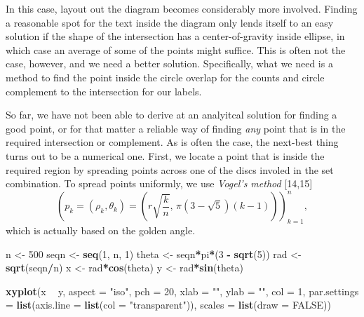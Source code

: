 \documentclass[
  headsepline=true,headings=standardclasses%
]{scrartcl}
\newenvironment{Shaded}{\begin{snugshade}}{\end{snugshade}}
\newcommand{\KeywordTok}[1]{\textcolor[rgb]{0.13,0.29,0.53}{\textbf{#1}}}
\newcommand{\DataTypeTok}[1]{\textcolor[rgb]{0.13,0.29,0.53}{#1}}
\newcommand{\DecValTok}[1]{\textcolor[rgb]{0.00,0.00,0.81}{#1}}
\newcommand{\StringTok}[1]{\textcolor[rgb]{0.31,0.60,0.02}{#1}}
\newcommand{\OtherTok}[1]{\textcolor[rgb]{0.56,0.35,0.01}{#1}}
\newcommand{\OperatorTok}[1]{\textcolor[rgb]{0.81,0.36,0.00}{\textbf{#1}}}
\newcommand{\NormalTok}[1]{#1}
\theoremstyle{definition}
\theoremstyle{definition}
\theoremstyle{remark}
\begin{document}
In this case, layout out the diagram becomes considerably more involved.
Finding a reasonable spot for the text inside the diagram only lends
itself to an easy solution if the shape of the intersection has a
center-of-gravity inside ellipse, in which case an average of some of
the points might suffice. This is often not the case, however, and we
need a better solution. Specifically, what we need is a method to find
the point inside the circle overlap for the counts and circle complement
to the intersection for our labels.

So far, we have not been able to derive at an analyitcal solution for
finding a good point, or for that matter a reliable way of finding
\emph{any} point that is in the required intersection or complement. As
is often the case, the next-best thing turns out to be a numerical one.
First, we locate a point that is inside the required region by spreading
points across one of the discs involed in the set combination. To spread
points uniformly, we use \emph{Vogel's method} {[}14,15{]} \[
\left( p_k = (\rho_k, \theta_k) = \left( r \sqrt{\frac{k}{n}},\, \pi (3 - \sqrt{5})(k - 1) \right) \right)_{k=1}^n,
\] which is actually based on the golden angle.

\begin{Shaded}
\begin{Highlighting}[]
\NormalTok{n <-}\StringTok{ }\DecValTok{500}
\NormalTok{seqn <-}\StringTok{ }\KeywordTok{seq}\NormalTok{(}\DecValTok{1}\NormalTok{, n, }\DecValTok{1}\NormalTok{)}
\NormalTok{theta <-}\StringTok{ }\NormalTok{seqn}\OperatorTok{*}\NormalTok{pi}\OperatorTok{*}\NormalTok{(}\DecValTok{3} \OperatorTok{-}\StringTok{ }\KeywordTok{sqrt}\NormalTok{(}\DecValTok{5}\NormalTok{))}
\NormalTok{rad <-}\StringTok{ }\KeywordTok{sqrt}\NormalTok{(seqn}\OperatorTok{/}\NormalTok{n)}
\NormalTok{x <-}\StringTok{ }\NormalTok{rad}\OperatorTok{*}\KeywordTok{cos}\NormalTok{(theta)}
\NormalTok{y <-}\StringTok{ }\NormalTok{rad}\OperatorTok{*}\KeywordTok{sin}\NormalTok{(theta)}

\KeywordTok{xyplot}\NormalTok{(x }\OperatorTok{~}\StringTok{ }\NormalTok{y, }\DataTypeTok{aspect =} \StringTok{"iso"}\NormalTok{, }\DataTypeTok{pch =} \DecValTok{20}\NormalTok{, }\DataTypeTok{xlab =} \StringTok{""}\NormalTok{, }\DataTypeTok{ylab =} \StringTok{""}\NormalTok{,}
       \DataTypeTok{col =} \DecValTok{1}\NormalTok{,}
       \DataTypeTok{par.settings =} \KeywordTok{list}\NormalTok{(}\DataTypeTok{axis.line =} \KeywordTok{list}\NormalTok{(}\DataTypeTok{col =} \StringTok{"transparent"}\NormalTok{)),}
       \DataTypeTok{scales =} \KeywordTok{list}\NormalTok{(}\DataTypeTok{draw =} \OtherTok{FALSE}\NormalTok{))}
\end{Highlighting}
\end{Shaded}
\end{document}
